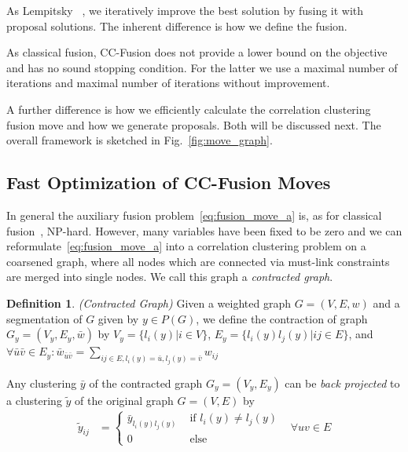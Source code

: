 \documentclass[10pt,twocolumn,letterpaper]{article}
\theoremstyle{definition}
\newtheorem{definition}{Definition}
\begin{document}
As Lempitsky \etal~\cite{Lempitsky-2010}, 
we iteratively improve the best solution by
fusing it with proposal solutions.
The inherent difference is how we define the fusion.

As classical fusion, CC-Fusion does not provide a lower bound on the objective and 
has no sound stopping condition.
For the latter we use a maximal number of iterations and maximal number of iterations without improvement.

A further difference is how we efficiently calculate the correlation clustering fusion move and how we generate proposals.
Both will be discussed next. The overall framework is sketched in Fig.~\ref{fig:move_graph}.




%
%
%

%


\subsection{Fast Optimization of CC-Fusion Moves} \label{sec:fast_optimization}
In general the auxiliary fusion problem~\ref{eq:fusion_move_a} is, as for classical fusion~\cite{Lempitsky-2010}, NP-hard.
However, many variables have been fixed to be zero and we can reformulate~\ref{eq:fusion_move_a}
into a correlation clustering problem on a coarsened graph, where all nodes which are connected
via must-link constraints are merged into single nodes. We call this graph a \emph{contracted graph}.
%
\begin{definition}\emph{(Contracted Graph)}
Given a weighted graph $G=(V,E,w)$ and a segmentation of $G$ given by $y\in P(G)$,
we define the contraction of graph $G_y=(V_y,E_y, \bar{w})$
by $V_y=\{l_i(y)|i\in V\}$, $E_y=\{l_i(y)l_j(y)|ij\in E\}$, and 
$\forall \bar{u}\bar{v}\in E_y: \bar{w}_{\bar{u}\bar{v}}=\sum_{ij\in E, l_i(y)=\bar{u},l_j(y)=\bar{v}}w_{ij}$ 
\end{definition}
%
Any clustering $\bar{y}$ of the contracted graph $G_y=(V_y,E_y)$ can be \emph{back projected} to a clustering $\tilde{y}$ of the original graph $G=(V,E)$ by
%
\begin{align}
\tilde{y}_{ij}&=\left\{ 
\begin{array}{ll}
\bar{y}_{l_i(y)l_j(y)}& \textrm{ if }l_i(y) \neq l_j(y)\\
0                & \textrm{ else}
\end{array}
\right.& \forall uv \in E
\end{align}
\end{document}
